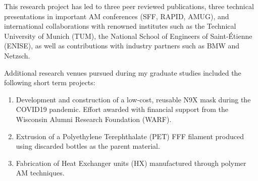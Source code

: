 \documentclass[11pt,letterpaper]{article}
\begin{document}
This research project has led to three peer reviewed publications, three technical presentations in important AM conferences (SFF, RAPID, AMUG), and international collaborations with renowned institutes such as the Technical University of Munich (TUM), the National School of Engineers of Saint-\'Etienne (ENISE), as well as contributions with industry partners such as BMW and Netzsch.


Additional research venues pursued during my graduate studies included the following short term projects:
\begin{enumerate}
	\item Development and construction of a low-cost, reusable N9X mask during the COVID19 pandemic. Effort awarded with financial support from the Wisconsin Alumni Research Foundation (WARF).
	\item Extrusion of a Polyethylene Terephthalate (PET) FFF filament produced using discarded bottles as the parent material.
	\item Fabrication of Heat Exchanger units (HX) manufactured through polymer AM techniques.
\end{enumerate}
\end{document}
